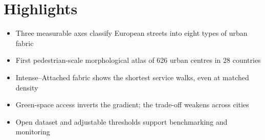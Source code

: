\documentclass{article}
\begin{document}
\section*{Highlights}

\begin{itemize}
  \item Three measurable axes classify European streets into eight types of urban fabric
  \item First pedestrian-scale morphological atlas of 626 urban centres in 28 countries
  \item Intense--Attached fabric shows the shortest service walks, even at matched density
  \item Green-space access inverts the gradient; the trade-off weakens across cities
  \item Open dataset and adjustable thresholds support benchmarking and monitoring
\end{itemize}
\end{document}
